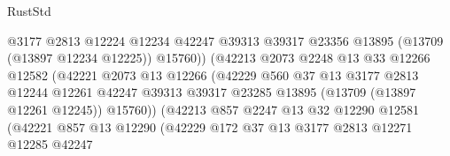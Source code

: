 \begin{lexlean}{RustStd}
\begin{coremodule}
                                      @3177
                                      @2813
                                      @12224
                                      @12234
                                      @42247
                                      @39313
                                      @39317
                                      @23356
                                      @13895
                                      (@13709 (@13897 @12234 @12225))
                                      @15760))
                                  (@42213
                                    @2073
                                    @2248
                                    @13
                                    @33
                                    @12266
                                    @12582
                                    (@42221
                                      @2073
                                      @13
                                      @12266
                                      (@42229
                                        @560
                                        @37
                                        @13
                                        @3177
                                        @2813
                                        @12244
                                        @12261
                                        @42247
                                        @39313
                                        @39317
                                        @23285
                                        @13895
                                        (@13709 (@13897 @12261 @12245))
                                        @15760))
                                    (@42213
                                      @857
                                      @2247
                                      @13
                                      @32
                                      @12290
                                      @12581
                                      (@42221
                                        @857
                                        @13
                                        @12290
                                        (@42229
                                          @172
                                          @37
                                          @13
                                          @3177
                                          @2813
                                          @12271
                                          @12285
                                          @42247

\end{coremodule}
\end{lexlean}

